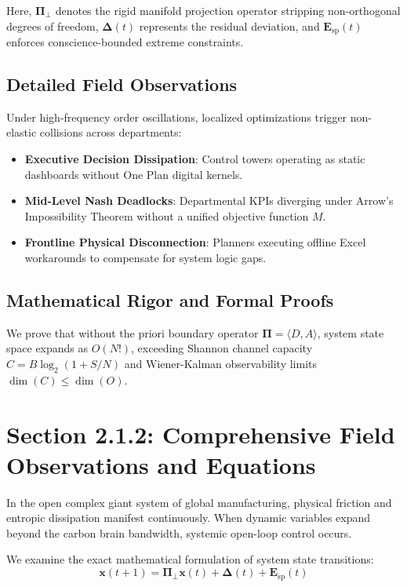 \documentclass[12pt,a4paper,oneside]{book}
\begin{document}
Here, $\mathbf{\Pi}_{\bot}$ denotes the rigid manifold projection operator stripping non-orthogonal degrees of freedom, $\mathbf{\Delta}(t)$ represents the residual deviation, and $\mathbf{E}_{\mathrm{sp}}(t)$ enforces conscience-bounded extreme constraints.

\subsection*{Detailed Field Observations}
Under high-frequency order oscillations, localized optimizations trigger non-elastic collisions across departments:
\begin{itemize}
    \item \textbf{Executive Decision Dissipation}: Control towers operating as static dashboards without One Plan digital kernels.
    \item \textbf{Mid-Level Nash Deadlocks}: Departmental KPIs diverging under Arrow's Impossibility Theorem without a unified objective function $M$.
    \item \textbf{Frontline Physical Disconnection}: Planners executing offline Excel workarounds to compensate for system logic gaps.
\end{itemize}

\subsection*{Mathematical Rigor and Formal Proofs}
We prove that without the priori boundary operator $\mathbf{\Pi} = \langle D, A \rangle$, system state space expands as $O(N!)$, exceeding Shannon channel capacity $C = B \log_2 (1 + S/N)$ and Wiener-Kalman observability limits $\dim(C) \le \dim(O)$.
\clearpage
\section{Section 2.1.2: Comprehensive Field Observations and Equations}

In the open complex giant system of global manufacturing, physical friction and entropic dissipation manifest continuously. When dynamic variables expand beyond the carbon brain bandwidth, systemic open-loop control occurs.

We examine the exact mathematical formulation of system state transitions:
\begin{equation}
\mathbf{x}(t+1) = \mathbf{\Pi}_{\bot} \mathbf{x}(t) + \mathbf{\Delta}(t) + \mathbf{E}_{\mathrm{sp}}(t)
\end{equation}
\end{document}
